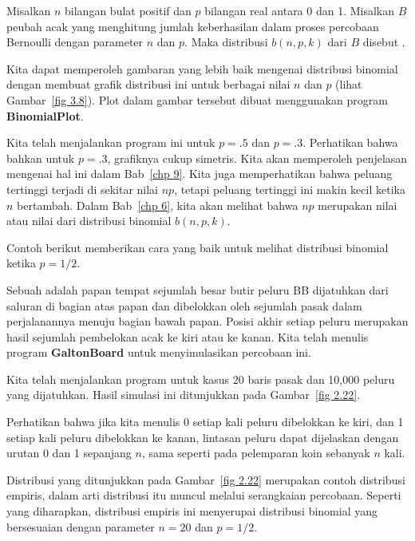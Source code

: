 \begin{definition}\label{def 3.5} Misalkan $n$ bilangan bulat positif dan $p$ bilangan
real antara 0 dan 1.  Misalkan $B$ peubah acak yang menghitung jumlah keberhasilan dalam
proses percobaan Bernoulli dengan parameter $n$ dan $p$.  Maka distribusi $b(n, p, k)$
dari $B$ disebut .
\end{definition}

Kita dapat memperoleh gambaran yang lebih baik mengenai distribusi binomial dengan
membuat grafik distribusi ini untuk berbagai nilai $n$ dan $p$ (lihat
Gambar~\ref{fig 3.8}).  Plot dalam gambar tersebut dibuat menggunakan program
{\bf BinomialPlot}.


\par Kita telah menjalankan program ini untuk $p = .5$ dan $p = .3$.  Perhatikan bahwa
bahkan untuk $p = .3$, grafiknya cukup simetris.  Kita akan memperoleh penjelasan
mengenai hal ini dalam Bab~\ref{chp 9}.   Kita juga memperhatikan bahwa peluang tertinggi
terjadi di sekitar nilai $np$, tetapi peluang tertinggi ini makin kecil ketika $n$
bertambah.  Dalam Bab~\ref{chp 6}, kita akan melihat bahwa $np$ merupakan nilai
 atau nilai  dari distribusi binomial $b(n,p,k)$.
\par
Contoh berikut memberikan cara yang baik untuk melihat distribusi binomial ketika $p =
1/2$.
\begin{example}\label{exam 3.2.1}
Sebuah  adalah papan tempat sejumlah besar butir
peluru BB dijatuhkan dari saluran di bagian atas papan dan dibelokkan oleh sejumlah pasak dalam
perjalanannya menuju bagian bawah papan.  Posisi akhir setiap peluru merupakan hasil
sejumlah pembelokan acak ke kiri atau ke kanan.  Kita telah menulis program
{\bf GaltonBoard} untuk menyimulasikan percobaan ini.
\par
Kita telah menjalankan program untuk kasus 20 baris pasak dan 10{,}000 peluru yang
dijatuhkan.  Hasil simulasi ini ditunjukkan pada Gambar~\ref{fig 2.22}.
\par
{} 

Perhatikan bahwa jika kita menulis 0 setiap kali peluru dibelokkan ke kiri, dan 1 setiap
kali peluru dibelokkan ke kanan, lintasan peluru dapat dijelaskan dengan urutan 0 dan 1
sepanjang $n$, sama seperti pada pelemparan koin sebanyak $n$ kali.
\par
Distribusi yang ditunjukkan pada Gambar~\ref{fig 2.22} merupakan contoh distribusi
empiris, dalam arti distribusi itu muncul melalui serangkaian percobaan.  Seperti yang
diharapkan, distribusi empiris ini menyerupai distribusi binomial yang bersesuaian dengan
parameter $n = 20$ dan $p = 1/2$.
\end{example}



